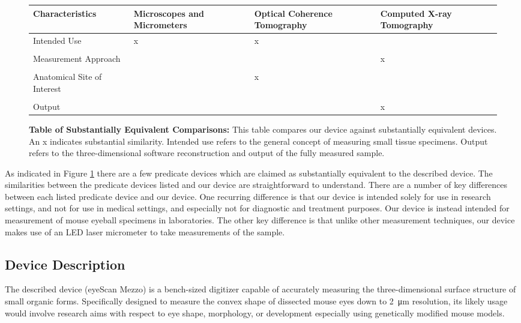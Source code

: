 \documentclass{article}
\begin{document}
\begin{figure}[H]
  \begin{tabularx}{\textwidth}{YYYY}
    \toprule
    Characteristics & \mbox{Microscopes} and \mbox{Micrometers} & Optical Coherence \mbox{Tomography} & Computed X-ray \mbox{Tomography} \\ 
    \hline
    Intended Use & x & x &  \\
    \\
    Measurement Approach &   &  & x \\ 
    \\
    Anatomical Site of Interest & & x &  \\
    \\
    Output & & & x \\
    \bottomrule
  \end{tabularx}
  \caption{\textbf{Table of Substantially Equivalent Comparisons:}
    This table compares our device against substantially equivalent
    devices. An x indicates substantial similarity. Intended use
    refers to the general concept of measuring small tissue
    specimens. Output refers to the three-dimensional software
    reconstruction and output of the fully measured sample.}
  \label{comparison}
\end{figure}

As indicated in Figure \ref{comparison} there are a few predicate
devices which are claimed as substantially equivalent to the described
device. The similarities between the predicate devices listed and our
device are straightforward to understand. There are a number of key
differences between each listed predicate device and our device. One
recurring difference is that our device is intended solely for use in
research settings, and not for use in medical settings, and especially
not for diagnostic and treatment purposes. Our device is instead
intended for measurement of mouse eyeball specimens in
laboratories. The other key difference is that unlike other
measurement techniques, our device makes use of an LED laser
micrometer to take measurements of the sample.

\newpage
\subsection{Device Description}

The described device (eyeScan Mezzo) is a bench-sized digitizer capable
of accurately measuring the three-dimensional surface structure of small
organic forms. Specifically designed to measure the convex shape of
dissected mouse eyes down to \SI{2}{\micro m} resolution, its likely
usage would involve research aims with respect to eye shape,
morphology, or development especially using genetically modified mouse
models.
\end{document}

